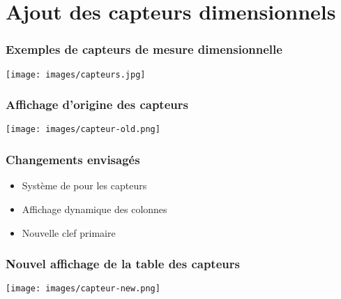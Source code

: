 \section{Ajout des capteurs dimensionnels}

\begin{frame}
    \centering
    \frametitle{Exemples de capteurs de mesure dimensionnelle}
    \texttt{[image: images/capteurs.jpg]}
\end{frame}

\begin{frame}
    \frametitle{Affichage d'origine des capteurs}
    \texttt{[image: images/capteur-old.png]} \\
\end{frame}

\begin{frame} 
    \frametitle{Changements envisagés}
    \begin{itemize}
        \item<2-> \alert<2>{Système de  pour les capteurs}
        \item<3-> \alert<3>{Affichage dynamique des colonnes}
        \item<4-> \alert<4>{Nouvelle clef primaire}
    \end{itemize}
\end{frame}

\begin{frame}
    \frametitle{Nouvel affichage de la table des capteurs}
    \texttt{[image: images/capteur-new.png]}
\end{frame}



